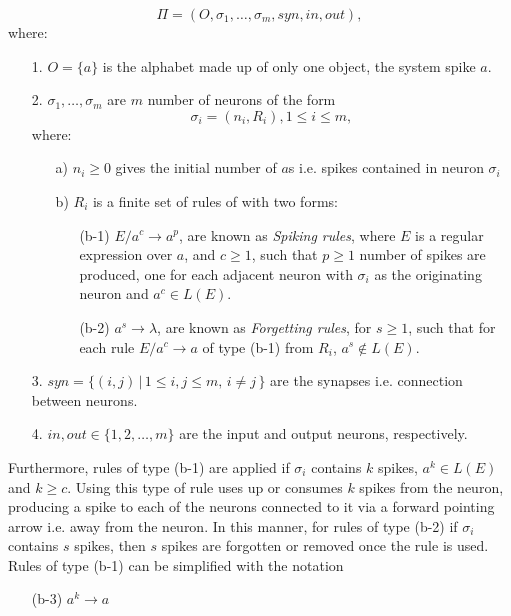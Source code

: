 \documentclass{svmultm}
\begin{document}
\begin{definition}\label{snpdefn}
$$\Pi=(O,\sigma_1,\ldots, \sigma_m, syn, in, out),$$
where:
\begin{enumerate}
\item[1.] $O=\{a\}$ is the alphabet made up of only one object, the system spike $a$.

\item[2.] $\sigma_1,\ldots, \sigma_m$ are $m$ number of neurons of the form
$$\sigma_{i}=(n_i, R_i),1\leq i\leq m,$$
where:
\begin{enumerate}
\item[a)] $n_i\geq 0$ gives the initial number of $a$s i.e. spikes contained in neuron $\sigma_i$
\item[b)] $R_i$ is a finite set of rules of with two forms:
\begin{enumerate}
\item[(b-1)]$E/a^c \rightarrow a^p$, are known as \textit{Spiking rules}, where $E$ is a regular expression
over $a$, and $c\geq 1$, such that $p\geq 1$ number of spikes are produced, one for each adjacent neuron with $\sigma_i$ as the originating neuron and $a^c \in L(E)$.
\item[(b-2)]$a^s\rightarrow \lambda$, are known as \textit{Forgetting rules}, for $s\geq 1$, such that for each rule $E/a^c\rightarrow a$ of type (b-1) from $R_i$, $a^s\notin L(E)$. 
\end{enumerate}
\end{enumerate}
\item[3.] $syn= \{ (i,j)\, |\, 1\leq i,j \leq m, \, i\neq j\, \}$ are the synapses i.e. connection between neurons.

\item[4.] $in, out\in \{1,2,\ldots, m\}$ are the input and output neurons, respectively.
\end{enumerate}

\end{definition}

Furthermore, rules of type (b-1) are applied if $\sigma_i$ contains $k$
spikes, $a^k \in L(E)$ and $k \geq c$. Using this type of rule uses up
or consumes $k$ spikes from the neuron, producing a spike to
each of the neurons connected to it via a forward pointing arrow i.e. away from the neuron. In this manner, for rules of type (b-2)
if $\sigma_i$ contains $s$ spikes, then $s$ spikes are forgotten or
removed once the rule is used. Rules of type (b-1) can be
simplified with the notation

\begin{definition}
\begin{enumerate}
\begin{enumerate}
\item[(b-3)]$a^k \rightarrow a$
\end{enumerate}
\end{enumerate}
\end{definition}
\end{document}
